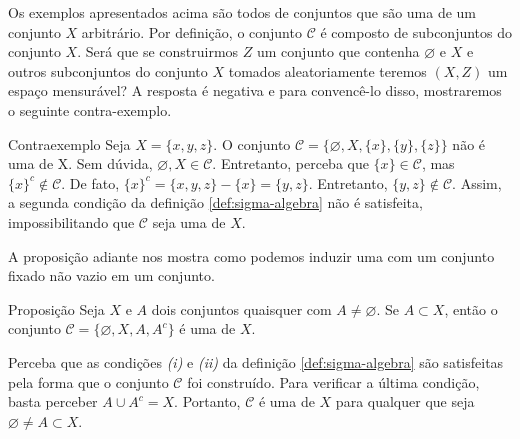 Os exemplos apresentados acima são todos de conjuntos que são uma \sigal de um conjunto $X$ arbitrário.
Por definição, o conjunto $\mathcal{C}$ é composto de subconjuntos do conjunto $X$. 
Será que se construirmos $Z$ um conjunto que contenha $\varnothing$ e $X$ e outros subconjuntos do conjunto $X$ tomados aleatoriamente teremos $(X,Z)$ um espaço mensurável? A resposta é negativa e para convencê-lo disso, mostraremos o seguinte contra-exemplo.

\begin{env}{Contraexemplo}
    Seja $X = \{x,y,z\}$. O conjunto $\mathcal{C} = \{\varnothing, X, \{x\}, \{y\}, \{z\}\}$ não é uma \sigal de X.
    Sem dúvida, $\varnothing, X \in \mathcal{C}$. 
    Entretanto, perceba que $\{x\} \in \mathcal{C}$, mas $\{x\}^c \notin \mathcal{C}$.
    De fato, 
    $
    \{x\}^c
    =\{x,y,z\} 
    -\{x\} 
    = \{y,z\}.
    $
    Entretanto, $\{y,z\} \notin \mathcal{C}$.
    Assim, a segunda condição da definição \ref{def:sigma-algebra} não é satisfeita, impossibilitando que $\mathcal{C}$ seja uma \sigal de $X$.
    \vspace{-0.2cm}
\end{env}

A proposição adiante nos mostra como podemos induzir uma \sigal com um conjunto fixado não vazio em um conjunto.


\begin{env}{Proposição}
\label{prop:sigma-complementar}
    Seja $X$ e $A$ dois conjuntos quaisquer com $A \neq \varnothing$.
    Se $A \subset X$, então o conjunto 
    $\mathcal{C}=\{\varnothing, X, A, A^c\}$ é uma \sigal de $X$.
    \vspace{-0.2cm}
\end{env}

\begin{prova}
    Perceba que as condições \textit{(i)} e \textit{(ii)} da definição \ref{def:sigma-algebra} são satisfeitas pela forma que o conjunto  $\mathcal{C}$ foi construído. Para verificar a última condição, basta perceber $A \cup A^c = X$. Portanto, $\mathcal{C}$ é uma \sigal de $X$ para qualquer que seja $ \varnothing \neq A \subset X$.
\end{prova}

